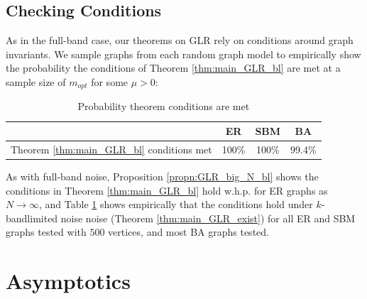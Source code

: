 \subsection{Checking Conditions}
As in the full-band case, our theorems on GLR rely on conditions around graph invariants.  We sample graphs from each random graph model to empirically show the probability the conditions of Theorem \ref{thm:main_GLR_bl} are met at a sample size of $m_{opt}$ for some $\mu > 0$:
\vspace{-0.2cm}
\begin{table}[h!]
\caption{Probability theorem conditions are met}
    \begin{center}
        \begin{tabular}{|l|c|c|c|}
     \hline
       & \textbf{ER} & \textbf{SBM} & \textbf{BA} \\ 
     \hline
     Theorem \ref{thm:main_GLR_bl} conditions met & 100\% & 100\% & 99.4\% \\ \hline
        \end{tabular}
    \end{center}
    \label{tbl:empirical_probabilities_conditions_bl}
\end{table}
\vspace{-0.2cm}

As with full-band noise, Proposition \ref{propn:GLR_big_N_bl} shows the conditions in Theorem \ref{thm:main_GLR_bl} hold w.h.p. for ER graphs as $N \to \infty$, and Table \ref{tbl:empirical_probabilities_conditions_bl} shows empirically that the conditions hold under $k$-bandlimited noise noise (Theorem \ref{thm:main_GLR_exist}) for all ER and SBM graphs tested with $500$ vertices, and most BA graphs tested.

\section{Asymptotics}
\label{app:Asymptotics}


